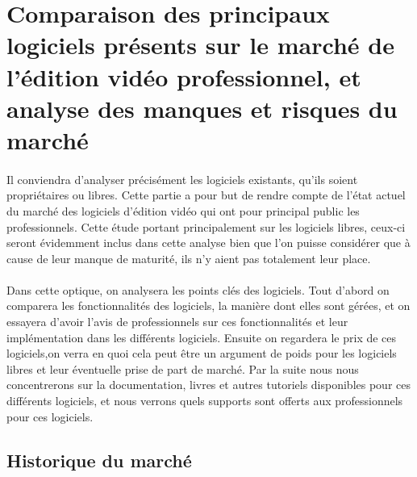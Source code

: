 \newpage \section{Comparaison des principaux logiciels présents sur le
marché de l'édition vidéo professionnel, et analyse des manques et
risques du marché}

\paragraph{}

Il conviendra d'analyser précisément les logiciels existants, qu'ils
soient propriétaires ou libres. Cette partie a pour but de rendre compte
de l'état actuel du marché des logiciels d'édition vidéo qui ont pour
principal public les professionnels. Cette étude portant principalement
sur les logiciels libres, ceux-ci seront évidemment inclus dans cette
analyse bien que l'on puisse considérer que à cause de leur manque de
maturité, ils n'y aient pas totalement leur place.

\paragraph{}

Dans cette optique, on analysera les points clés des logiciels.
Tout d'abord on comparera les fonctionnalités des logiciels, la manière
dont elles sont gérées, et on essayera d'avoir l'avis de professionnels
sur ces fonctionnalités et leur implémentation dans les différents
logiciels. Ensuite on regardera le prix de ces logiciels,on verra en quoi
cela peut être un argument de poids pour les logiciels libres et leur
éventuelle prise de part de marché. Par la suite nous nous concentrerons
sur la documentation, livres et autres tutoriels disponibles pour ces
différents logiciels, et nous verrons quels supports sont offerts aux
professionnels pour ces logiciels.

\subsection {Historique du marché}

\paragraph{}

